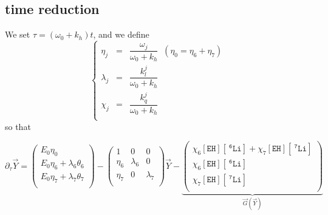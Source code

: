 \documentclass[aps,onecolumn,11pt]{revtex4}
\newcommand{\mychem}[1]{\mathtt{#1}}
\newcommand{\myconc}[1]{\left\lbrack{#1}\right\rbrack}
\newcommand{\spLi}[1]{{~^{\mychem{#1}}\mychem{Li}}}
\newcommand{\Li}[1]{\myconc{\spLi{#1}}}
\newcommand{\spEHin}{\mychem{EH}}
\newcommand{\EHin}{\myconc{\spEHin}}
\begin{document}
\subsection{time reduction}
We set $\tau = \left(\omega_0+k_h\right) t$, and we define
\begin{equation}
	\left\lbrace
	\begin{array}{rcl}
	\eta_j    & = & \dfrac{\omega_j}{\omega_0+k_h}\;\;(\eta_0=\eta_6+\eta_7)\\
	\lambda_j & = & \dfrac{k_l^j}{\omega_0+k_h}   \\
	\chi_j    & = & \dfrac{k_q^j}{\omega_0+k_h}   \\
	\end{array}
	\right.
\end{equation}
so that


\begin{equation}
	\partial_\tau \vec{Y} = 
	\begin{pmatrix}
		E_0 \eta_0 \\
		E_0 \eta_6 + \lambda_6 \theta_6\\
		E_0 \eta_7 + \lambda_7 \theta_7\\
	\end{pmatrix}
	-
	\begin{pmatrix}
	1&0&0\\
	\eta_6&\lambda_6&0\\
	\eta_7&0&\lambda_7\\
	\end{pmatrix} 
	\vec{Y}
	-
	\underbrace{
	\begin{pmatrix}
	\chi_6 \EHin \Li{6} + \chi_7 \EHin \Li{7}\\
	\chi_6 \EHin \Li{6} \\
	\chi_7 \EHin \Li{7} \\
	\end{pmatrix}
	}_{\vec{G}\left(\vec{Y}\right)}
\end{equation}
\end{document}
